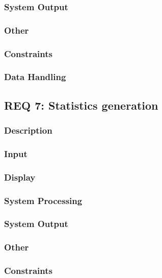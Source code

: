\documentclass[a4paper, 11pt]{article} %
\begin{document}
\subsubsection{System Output}

\subsubsection{Other}

\subsubsection{Constraints}

\subsubsection{Data Handling}

\newpage

\subsection{REQ 7: Statistics generation}

\subsubsection{Description}

\subsubsection{Input}

\subsubsection{Display}

\subsubsection{System Processing}

\subsubsection{System Output}

\subsubsection{Other}

\subsubsection{Constraints}
\end{document}
